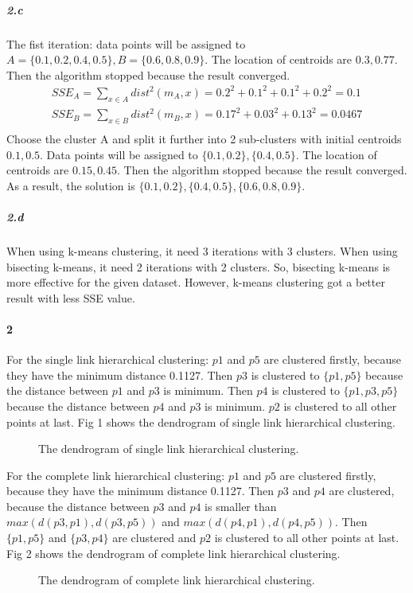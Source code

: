 \documentclass[22pt]{article}
\begin{document}
		\subparagraph{2.c}
		The fist iteration: data points will be assigned to $A=\{0.1,0.2,0.4,0.5\},B=\{0.6,0.8,0.9\}$. The location of centroids are $0.3,0.77$. Then the algorithm stopped because the result converged.\\
		\begin{align}
			SSE_A =  \sum\limits_{x\in A} dist^2(m_A,x) = 0.2^2+0.1^2+0.1^2+0.2^2 = 0.1\\
			SSE_B =  \sum\limits_{x\in B} dist^2(m_B,x) = 0.17^2+0.03^2+0.13^2= 0.0467\\
		\end{align}
		Choose the cluster A and split it further into 2 sub-clusters with initial centroids $0.1,0.5$. Data points will be assigned to $\{0.1,0.2\},\{0.4,0.5\}$. The location of centroids are $0.15,0.45$. Then the algorithm stopped because the result converged.\\
		As a result, the solution is $\{0.1,0.2\},\{0.4,0.5\},\{0.6,0.8,0.9\}$.

		\subparagraph{2.d} When using k-means clustering, it need 3 iterations with 3 clusters. When using bisecting k-means, it need 2 iterations with 2 clusters. So, bisecting k-means is more effective for the given dataset. However, k-means clustering got a better result with less SSE value.

	\paragraph{2} For the single link hierarchical clustering: $p1$ and $p5$ are clustered firstly, because they have the minimum distance 0.1127. Then $p3$ is clustered to $\{p1,p5\}$ because the distance between $p1$ and $p3$ is minimum. Then  $p4$ is clustered to $\{p1,p3,p5\}$ because the distance between $p4$ and $p3$ is minimum. $p2$ is clustered to all other points at last. Fig 1 shows the dendrogram of single link hierarchical clustering.
	\begin{figure}[H]
				\centering
				\caption{The dendrogram of single link hierarchical clustering.  }
\end{figure}

	For the complete link hierarchical clustering: $p1$ and $p5$ are clustered firstly, because they have the minimum distance 0.1127. Then $p3$ and $p4$ are clustered, because the distance between $p3$ and $p4$ is smaller than $max(d(p3,p1),d(p3,p5))$ and $max(d(p4,p1),d(p4,p5))$. Then $\{p1,p5\}$ and $\{p3,p4\}$ are clustered and  $p2$ is clustered to all other points at last. Fig 2 shows the dendrogram of complete link hierarchical clustering.
	\begin{figure}[H]
				\centering
				\caption{The dendrogram of complete link hierarchical clustering.  }
\end{figure}
\end{document}
